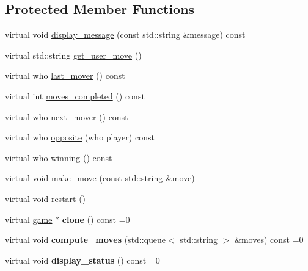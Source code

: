 \subsection*{Protected Member Functions}
\begin{DoxyCompactItemize}
\item 
virtual void \hyperlink{classmain__savitch__14_1_1game_ac58bfc07db8e604b07d2039b2cf7ab51}{display\+\_\+message} (const std\+::string \&message) const
\item 
virtual std\+::string \hyperlink{classmain__savitch__14_1_1game_af389f976b7a6c75e096990a09fac94ba}{get\+\_\+user\+\_\+move} ()
\item 
virtual who \hyperlink{classmain__savitch__14_1_1game_a5c1ab8b36fb977bbe9fe387e793e4ee5}{last\+\_\+mover} () const
\item 
virtual int \hyperlink{classmain__savitch__14_1_1game_a31dd5382cc6d64a6d58bcee55383cf1b}{moves\+\_\+completed} () const
\item 
virtual who \hyperlink{classmain__savitch__14_1_1game_a4e68409618474d19742dd5f75f92f5c9}{next\+\_\+mover} () const
\item 
virtual who \hyperlink{classmain__savitch__14_1_1game_a98469e89e13c73a5ee70407a2164888c}{opposite} (who player) const
\item 
virtual who \hyperlink{classmain__savitch__14_1_1game_a2f0d5338c12bd98d52fe2383ece5c45e}{winning} () const
\item 
virtual void \hyperlink{classmain__savitch__14_1_1game_a20597d0caa907aea47b27fed8be3759b}{make\+\_\+move} (const std\+::string \&move)
\item 
virtual void \hyperlink{classmain__savitch__14_1_1game_ad521a7d78e7c163a0bc28b709f0d45fd}{restart} ()
\item 
\mbox{\label{classmain__savitch__14_1_1game_a7b663057f59210dd52738facfc40d959}} 
virtual \hyperlink{classmain__savitch__14_1_1game}{game} $\ast$ {\bfseries clone} () const =0
\item 
\mbox{\label{classmain__savitch__14_1_1game_a2c0c049f5861026d0f639b5837889b7a}} 
virtual void {\bfseries compute\+\_\+moves} (std\+::queue$<$ std\+::string $>$ \&moves) const =0
\item 
\mbox{\label{classmain__savitch__14_1_1game_ac8205178922c49bab2865187e834b726}} 
virtual void {\bfseries display\+\_\+status} () const =0

\end{DoxyCompactItemize}
